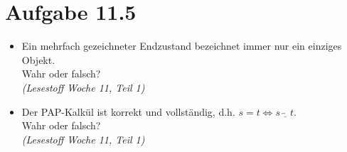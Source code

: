 \documentclass[12pt, paper=a4]{article}
\begin{document}
\section*{Aufgabe 11.5}
\begin{itemize}
	\item Ein mehrfach gezeichneter Endzustand bezeichnet immer nur ein einziges Objekt. \\
		Wahr oder falsch?\\
		\textit{(Lesestoff Woche 11, Teil 1)}
	\item Der PAP-Kalk\"ul ist korrekt und vollst\"andig, d.h. \(s = t \Leftrightarrow s \overleftrightarrow{\underline{\quad}} t\).\\
		Wahr oder falsch?\\
		\textit{(Lesestoff Woche 11, Teil 1)}
\end{itemize}
\end{document}
